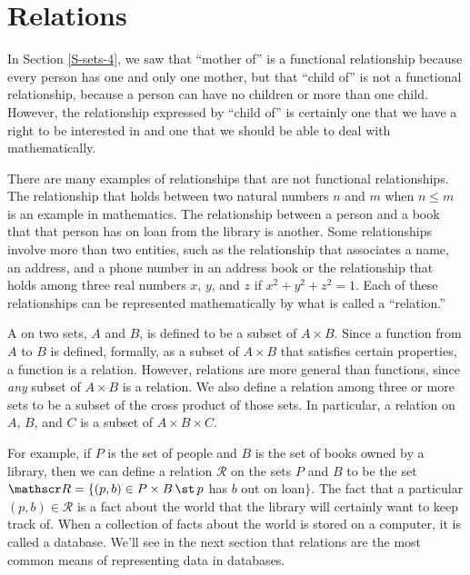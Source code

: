 \section{Relations}\label{S-sets-7}

In Section \ref{S-sets-4}, we saw that ``mother of'' is a functional
relationship because every person has one and only one mother,
but that ``child of'' is not a functional relationship,
because a person can have no children or more than one child.
However, the relationship expressed by ``child of'' is certainly 
one that we have a right to be interested in and one
that we should be able to deal with mathematically.

There are many examples of relationships that are not functional
relationships.  The relationship that holds between two 
natural numbers $n$ and $m$ when $n\le m$ is an example in mathematics.
The relationship between a person and a book that that person has
on loan from the library is another.  Some relationships
involve more than two entities, such as the relationship
that associates a name, an address, and a phone number in
an address book or the relationship that holds among three
real numbers $x$, $y$, and $z$ if $x^2+y^2+z^2=1$.  Each of
these relationships can be represented mathematically by
what is called a ``relation.''

A  on two sets, $A$ and $B$, is defined to be a subset
of $A\times B$.  Since a function from $A$ to $B$ is defined, formally, as
a subset of $A\times B$ that satisfies certain properties, a function
is a relation.  However, relations are more general than functions,
since \emph{any} subset of $A\times B$ is a relation.  We also
define a relation among three or more sets to be a subset of the
cross product of those sets.  In particular, a relation on
$A$, $B$, and $C$ is a subset of $A\times B\times C$.

For example, if $P$ is the set of people and $B$ is the set of books owned
by a library, then we can define a relation ${\mathscr R}$ on the sets
$P$ and $B$ to be the set ${\mathscr R}=\{(p,b)\in P\times B\,\st\, p$
has $b$ out on loan$\}$.  The fact that a particular 
$(p,b)\in{\mathscr R}$ is a fact about the world that the library
will certainly want to keep track of.  When a collection of
facts about the world is stored on a computer, it is called
a database.  We'll see in the next section that
relations are the most common means of representing data in
databases.

